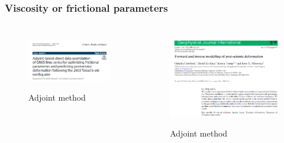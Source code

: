 ﻿\documentclass{beamer}
\begin{document}
\begin{frame}
\frametitle{Viscosity or frictional parameters}

\begin{columns}[c] %

\begin{figure}
  \centering
  \includegraphics[scale=0.3]{./pic/adjoint1.png}\\
  \caption{Adjoint method}\label{fig_okada}
\end{figure}

\begin{figure}
  \centering
  \includegraphics[scale=0.25]{./pic/adjoint2.png}\\
  \caption{Adjoint method}\label{fig_okada}
\end{figure}

\end{columns}

\end{frame}
\end{document}
